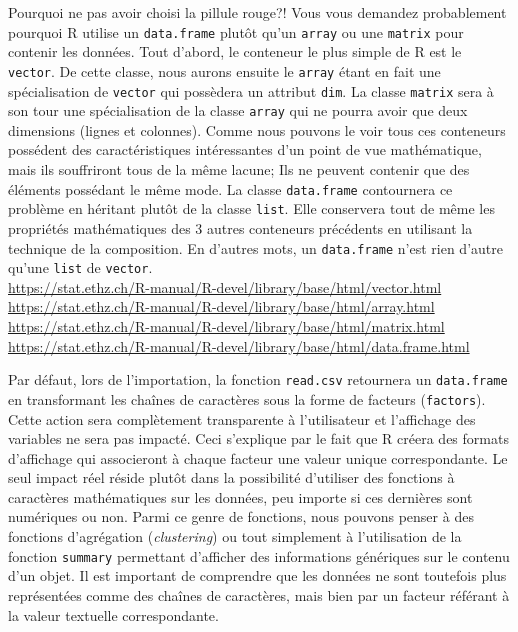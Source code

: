 \begin{moreInfo}{Pourquoi ne pas avoir choisi la pillule rouge?!}
	Vous vous demandez probablement pourquoi R utilise un \texttt{data.frame} plutôt qu'un \texttt{array} ou une \texttt{matrix} pour contenir les données. Tout d'abord, le conteneur le plus simple de R est le \texttt{vector}. De cette classe, nous aurons ensuite le \texttt{array} étant en fait une spécialisation de \texttt{vector} qui possèdera un attribut \texttt{dim}. La classe \texttt{matrix} sera à son tour une spécialisation de la classe \texttt{array} qui ne pourra avoir que deux dimensions (lignes et colonnes). Comme nous pouvons le voir tous ces conteneurs possédent des caractéristiques intéressantes d'un point de vue mathématique, mais ils souffriront tous de la même lacune; Ils ne peuvent contenir que des éléments possédant le même mode. La classe \texttt{data.frame} contournera ce problème en héritant plutôt de la classe \texttt{list}. Elle conservera tout de même les propriétés mathématiques des 3 autres conteneurs précédents en utilisant la technique de la composition. En d'autres mots, un \texttt{data.frame} n'est rien d'autre qu'une \texttt{list} de \texttt{vector}. \\
	\url{https://stat.ethz.ch/R-manual/R-devel/library/base/html/vector.html} \\
	\url{https://stat.ethz.ch/R-manual/R-devel/library/base/html/array.html} \\
	\url{https://stat.ethz.ch/R-manual/R-devel/library/base/html/matrix.html} \\
	\url{https://stat.ethz.ch/R-manual/R-devel/library/base/html/data.frame.html} 
\end{moreInfo}

Par défaut, lors de l'importation, la fonction \texttt{read.csv} retournera un \texttt{data.frame} en transformant les chaînes de caractères sous la forme de facteurs (\texttt{factors}). Cette action sera complètement transparente à l'utilisateur et l'affichage des variables ne sera pas impacté. Ceci s'explique par le fait que R créera des formats d'affichage qui associeront à chaque facteur une valeur unique correspondante. Le seul impact réel réside plutôt dans la possibilité d'utiliser des fonctions à caractères mathématiques sur les données, peu importe si ces dernières sont numériques ou non. Parmi ce genre de fonctions, nous pouvons penser à des fonctions d'agrégation (\emph{clustering}) ou tout simplement à l'utilisation de la fonction \texttt{summary} \cite{Rfunction:summary} permettant d'afficher des informations génériques sur le contenu d'un objet. Il est important de comprendre que les données ne sont toutefois plus représentées comme des chaînes de caractères, mais bien par un facteur référant à la valeur textuelle correspondante. \\

